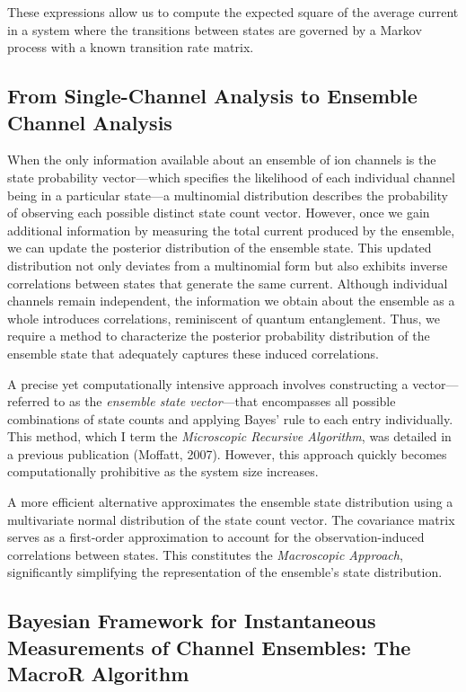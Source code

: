 \documentclass[pdflatex,sn-mathphys-num]{sn-jnl}%
\theoremstyle{thmstyleone}%
\theoremstyle{thmstyletwo}%
\theoremstyle{thmstylethree}%
\begin{document}
These expressions allow us to compute the expected square of the average current in a system where the transitions between states are governed by a Markov process with a known transition rate matrix.






\subsection{From Single-Channel Analysis to Ensemble Channel Analysis}

When the only information available about an ensemble of ion channels is the state probability vector—which specifies the likelihood of each individual channel being in a particular state—a multinomial distribution describes the probability of observing each possible distinct state count vector. However, once we gain additional information by measuring the total current produced by the ensemble, we can update the posterior distribution of the ensemble state. This updated distribution not only deviates from a multinomial form but also exhibits inverse correlations between states that generate the same current. Although individual channels remain independent, the information we obtain about the ensemble as a whole introduces correlations, reminiscent of quantum entanglement. Thus, we require a method to characterize the posterior probability distribution of the ensemble state that adequately captures these induced correlations.

A precise yet computationally intensive approach involves constructing a vector—referred to as the \textit{ensemble state vector}—that encompasses all possible combinations of state counts and applying Bayes' rule to each entry individually. This method, which I term the \textit{Microscopic Recursive Algorithm}, was detailed in a previous publication (Moffatt, 2007). However, this approach quickly becomes computationally prohibitive as the system size increases.

A more efficient alternative approximates the ensemble state distribution using a multivariate normal distribution of the state count vector. The covariance matrix serves as a first-order approximation to account for the observation-induced correlations between states. This constitutes the \textit{Macroscopic Approach}, significantly simplifying the representation of the ensemble's state distribution.



\subsection{Bayesian Framework for Instantaneous Measurements of Channel Ensembles: The MacroR Algorithm}
\end{document}
